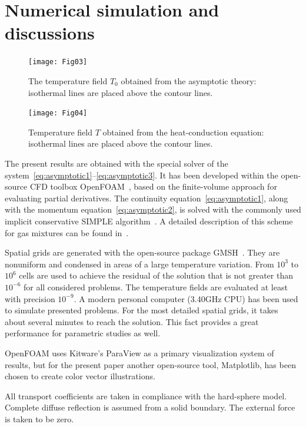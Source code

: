 \documentclass[smallextended, referee]{svjour3} %
\begin{document}
\section{Numerical simulation and discussions}

\begin{figure}[ht]
    \centering
    \texttt{[image: Fig03]}
    \caption{The temperature field \(T_0\) obtained from the asymptotic theory:
        isothermal lines are placed above the contour lines.}
    \label{fig:moving:T_asym}
\end{figure}

\begin{figure}[ht]
    \centering
    \texttt{[image: Fig04]}
    \caption{Temperature field \(T\) obtained from the heat-conduction equation:
        isothermal lines are placed above the contour lines.}
    \label{fig:moving:T_heat}
\end{figure}

The present results are obtained with the special solver of the system~\eqref{eq:asymptotic1}--\eqref{eq:asymptotic3}.
It has been developed within the open-source CFD toolbox OpenFOAM\textregistered{}~\cite{OpenFOAM1998},
based on the finite-volume approach for evaluating partial derivatives.
The continuity equation~\eqref{eq:asymptotic1}, along with the momentum equation~\eqref{eq:asymptotic2},
is solved with the commonly used implicit conservative SIMPLE algorithm~\cite{SIMPLE}.
A detailed description of this scheme for gas mixtures can be found in~\cite{Laneryd2007}.

Spatial grids are generated with the open-source package GMSH~\cite{GMSH}.
They are nonuniform and condensed in areas of a large temperature variation.
From \(10^3\) to \(10^6\) cells are used to achieve the residual of the solution
that is not greater than \(10^{-6}\) for all considered problems.
The temperature fields are evaluated at least with precision \(10^{-9}\).
A modern personal computer (3.40GHz CPU) has been used to simulate presented problems.
For the most detailed spatial grids, it takes about several minutes to reach the solution.
This fact provides a great performance for parametric studies as well.

OpenFOAM\textregistered{} uses Kitware's ParaView\textregistered{} as a primary visualization system of results,
but for the present paper another open-source tool, Matplotlib, has been chosen to create color vector illustrations.

All transport coefficients are taken in compliance with the hard-sphere model.
Complete diffuse reflection is assumed from a solid boundary.
The external force is taken to be zero.
\end{document}
